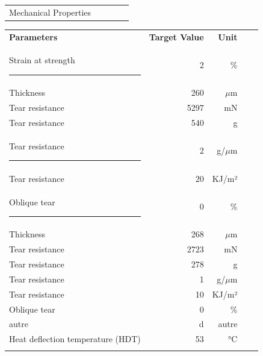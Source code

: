 \documentclass{article}
\begin{document}
\begin{center}
\begin{tabularx}
{\textwidth}{X r  r  r  r }\rowcolor{color_title}Mechanical Properties &  &  &  &  \\

\end{tabularx}\begin{paracol}{2}
\begin{tabularx}{0.5\textwidth}
{X r  r  r  r }\textbf{Parameters} & \textbf{Target Value} & \textbf{Unit} &  &  \\
Strain at strength \rule{80pt}{0pt} & 2 & \% &  &  \\
\arrayrulecolor{line_color}\hline
Thickness & 260 & \(\mu\)m &  &  \\
\arrayrulecolor{line_color}\hline
Tear resistance & 5297 & mN &  &  \\
\arrayrulecolor{line_color}\hline
Tear resistance & 540 & g &  &  \\
\arrayrulecolor{line_color}\hline
Tear resistance \rule{80pt}{0pt} & 2 & g/\(\mu\)m &  &  \\
\arrayrulecolor{line_color}\hline
Tear resistance & 20 & KJ/m² &  &  \\
\arrayrulecolor{line_color}\hline
Oblique tear \rule{80pt}{0pt} & 0 & \% &  &  \\
\arrayrulecolor{line_color}\hline
Thickness & 268 & \(\mu\)m &  &  \\
\arrayrulecolor{line_color}\hline
Tear resistance & 2723 & mN &  &  \\
\arrayrulecolor{line_color}\hline
Tear resistance & 278 & g &  &  \\
\arrayrulecolor{line_color}\hline
Tear resistance & 1 & g/\(\mu\)m &  &  \\
\arrayrulecolor{line_color}\hline
Tear resistance & 10 & KJ/m² &  &  \\
\arrayrulecolor{line_color}\hline
Oblique tear & 0 & \% &  &  \\
\arrayrulecolor{line_color}\hline
autre & d & autre &  &  \\
\arrayrulecolor{line_color}\hline
Heat deflection temperature (HDT) & 53 & °C &  &  \\
\arrayrulecolor{line_color}\hline


\end{tabularx}
\end{paracol}
\end{center}
\end{document}
